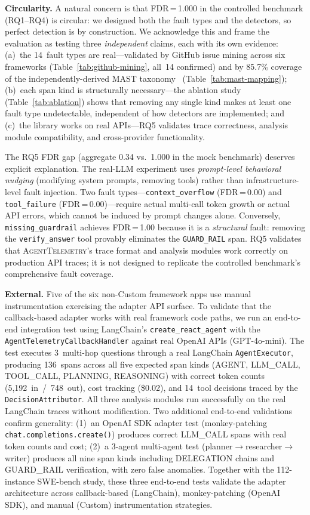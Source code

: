 \documentclass[sigplan,10pt,screen]{acmart}
\begin{document}
\textbf{Circularity.}
A natural concern is that FDR\,=\,1.000 in the controlled benchmark
(RQ1--RQ4) is circular: we designed both the fault types and the
detectors, so perfect detection is by construction.  We acknowledge
this and frame the evaluation as testing three \emph{independent}
claims, each with its own evidence: (a)~the 14~fault types are
real---validated by GitHub issue mining across six frameworks
(Table~\ref{tab:github-mining}, all~14 confirmed) and by 85.7\%
coverage of the independently-derived MAST taxonomy~\cite{mast}
(Table~\ref{tab:mast-mapping}); (b)~each span kind is structurally
necessary---the ablation study (Table~\ref{tab:ablation}) shows that
removing any single kind makes at least one fault type undetectable,
independent of how detectors are implemented; and (c)~the library
works on real APIs---RQ5 validates trace correctness, analysis module
compatibility, and cross-provider functionality.

The RQ5 FDR gap (aggregate 0.34 vs.\ 1.000 in the mock benchmark)
deserves explicit explanation.  The real-LLM experiment uses
\emph{prompt-level behavioral nudging} (modifying system prompts,
removing tools) rather than infrastructure-level fault injection.
Two fault types---\texttt{context\_overflow} (FDR\,=\,0.00) and
\texttt{tool\_failure} (FDR\,=\,0.00)---require actual multi-call
token growth or actual API errors, which cannot be induced by prompt
changes alone.  Conversely, \texttt{missing\_guardrail} achieves
FDR\,=\,1.00 because it is a \emph{structural} fault: removing the
\texttt{verify\_answer} tool provably eliminates the
\texttt{GUARD\_RAIL} span.  RQ5 validates that
\textsc{AgentTelemetry}'s trace format and analysis modules work
correctly on production API traces; it is not designed to replicate
the controlled benchmark's comprehensive fault coverage.

\textbf{External.}  Five of the six non-Custom framework apps use manual
instrumentation exercising the adapter API surface.  To validate that the
callback-based adapter works with real framework code paths, we run an
end-to-end integration test using LangChain's \texttt{create\_react\_agent}
with the \texttt{AgentTelemetryCallbackHandler} against real OpenAI APIs
(GPT-4o-mini).  The test executes 3~multi-hop questions through a real
LangChain \texttt{AgentExecutor}, producing 136~spans across all five
expected span kinds (AGENT, LLM\_CALL, TOOL\_CALL, PLANNING, REASONING)
with correct token counts (5{,}192~in~/~748~out), cost tracking
(\$0.02), and 14~tool decisions traced by the \texttt{DecisionAttributor}.
All three analysis modules run successfully on the real LangChain traces
without modification.
Two additional end-to-end validations confirm generality: (1)~an OpenAI SDK
adapter test (monkey-patching \texttt{chat.completions.create()}) produces
correct LLM\_CALL spans with real token counts and cost; (2)~a 3-agent
multi-agent test (planner$\to$researcher$\to$writer) produces all nine span
kinds including DELEGATION chains and GUARD\_RAIL verification, with zero
false anomalies.  Together with the 112-instance SWE-bench study,
these three end-to-end tests validate the adapter architecture across
callback-based (LangChain), monkey-patching (OpenAI SDK), and manual
(Custom) instrumentation strategies.
\end{document}
